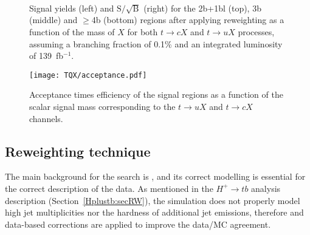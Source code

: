 \begin{figure}[htbp]
    \RawFloats
    \begin{center}
         \\
         \\
         \\
    \caption{
        Signal yields (left) and $\text{S}/\sqrt{\text{B}}$ (right) for the 2b+1bl (top), 3b (middle) and $\geq$4b (bottom) regions after applying reweighting as a function of the mass of $X$ for both $t\to cX$ and $t\to uX$ processes, assuming a branching fraction of 0.1\% and an integrated luminosity of 139~fb$^{-1}$.
    }
    \label{tqX:signalyields}
    \end{center}
\end{figure}

\begin{figure}[htbp]
    \RawFloats
    \begin{center}
    \texttt{[image: TQX/acceptance.pdf]}
    \caption{
        Acceptance times efficiency of the signal regions as a function of the scalar signal mass corresponding to
the $t\to uX$ and $t\to cX$ channels.
    }
    \label{tqX:acceptance}
    \end{center}
\end{figure}

\clearpage
\subsection{Reweighting technique}
\label{tqX:secRW}
The main background for the search is \ttjets, and its correct modelling is essential for the correct description of the data. As mentioned in the $H^+\to tb$ analysis description (Section~\ref{Hplustb:secRW}), the simulation does not properly model high jet multiplicities nor the hardness of additional jet emissions, therefore and data-based corrections are applied to improve the data/MC agreement.\\

